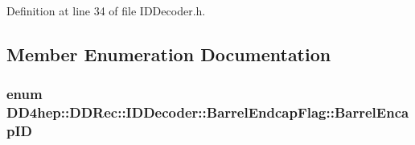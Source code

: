 Definition at line 34 of file IDDecoder.h.

\subsection{Member Enumeration Documentation}
\hypertarget{class_d_d4hep_1_1_d_d_rec_1_1_i_d_decoder_1_1_barrel_endcap_flag_acbdae4d36c49605ada531eddce7b60d8}{
\subsubsection[{BarrelEncapID}]{\setlength{\rightskip}{0pt plus 5cm}enum {\bf DD4hep::DDRec::IDDecoder::BarrelEndcapFlag::BarrelEncapID}}}
\label{class_d_d4hep_1_1_d_d_rec_1_1_i_d_decoder_1_1_barrel_endcap_flag_acbdae4d36c49605ada531eddce7b60d8}
